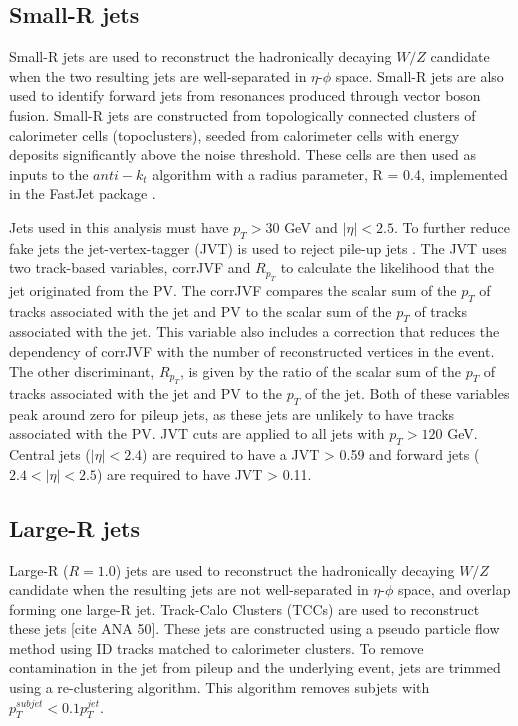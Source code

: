 \subsection{Small-R jets}
Small-R jets are used to reconstruct the hadronically decaying $W/Z$ candidate when the two resulting jets are well-separated in $\eta$-$\phi$ space. Small-R jets are also used to identify forward jets from resonances produced through vector boson fusion. Small-R jets are constructed from topologically connected clusters of calorimeter cells (topoclusters), seeded from calorimeter cells with energy deposits significantly above the noise threshold.  These cells are then used as inputs to the $anti-k_{t}$ algorithm \cite{antikt} with a radius parameter, R = 0.4, implemented in the FastJet package \cite{fastjet}. 

Jets used in this analysis must have $p_{T} > 30$ GeV and $|\eta| < 2.5$. To further reduce fake jets the jet-vertex-tagger (JVT) is used to reject pile-up jets \cite{jvt}. The JVT uses two track-based variables, corrJVF and $R_{p_{T}}$ to calculate the likelihood that the jet originated from the PV. The corrJVF compares the scalar sum of the $p_{T}$ of tracks associated with the jet and PV to the scalar sum of the $p_{T}$ of tracks associated with the jet. This variable also includes a correction that reduces the dependency of corrJVF with the number of reconstructed vertices in the event. The other discriminant, $R_{p_{T}}$, is given by the ratio of the scalar sum of the $p_{T}$ of tracks associated with the jet and PV to the $p_{T}$ of the jet. Both of these variables peak around zero for pileup jets, as these jets are unlikely to have tracks associated with the PV. JVT cuts are applied to all jets with $p_{T} > 120$ GeV. Central jets ($|\eta| < 2.4$) are required to have a JVT > 0.59 and forward jets ($2.4<|\eta| < 2.5$) are required to have JVT > 0.11. 

\subsection{Large-R jets}
Large-R ($R = 1.0$) jets are used to reconstruct the hadronically decaying $W/Z$ candidate when the resulting jets are not well-separated in $\eta$-$\phi$ space, and overlap forming one large-R jet. Track-Calo Clusters (TCCs) are used to reconstruct these jets [cite ANA 50]. These jets are constructed using a pseudo particle flow method using ID tracks matched to calorimeter clusters. To remove contamination in the jet from pileup and the underlying event, jets are trimmed using a re-clustering algorithm. This algorithm removes subjets with $p_{T}^{subjet} < 0.1p_{T}^{jet}$. 

